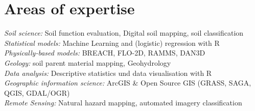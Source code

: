 \documentclass[a4paper]{twentysecondcv} %
\begin{document}

\aboutme{} %







\makeprofile %




\section{Areas of expertise}

\emph{Soil science:} Soil function evaluation, Digital soil mapping, soil classification\\[0.3em]
\emph{Statistical models:} Machine Learning and (logistic) regression with R\\[0.3em]
\emph{Physically-based models:}         BREACH, FLO-2D, RAMMS, DAN3D\\[0.3em]
\emph{Geology:} soil parent material mapping, Geohydrology\\[0.3em]
\emph{Data analysis:} Descriptive statistics und data visualisation with R\\[0.3em]
\emph{Geographic information science:} ArcGIS \& Open Source GIS (GRASS, SAGA, \hspace*{14.5em} QGIS, GDAL/OGR)\\[0.3em]
\emph{Remote Sensing:} Natural hazard mapping, automated imagery classification \\[0.3em]
\end{document}
